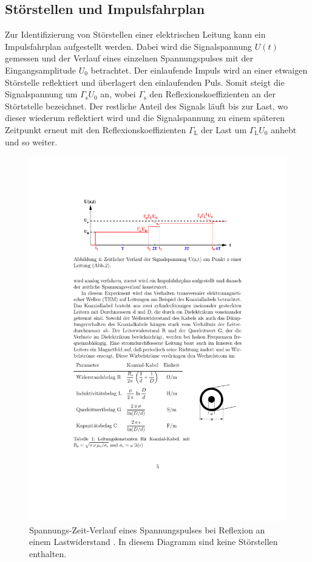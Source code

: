 \subsection{Störstellen und Impulsfahrplan} %
\label{sub:impulsfahrplan}
Zur Identifizierung von Störstellen einer elektrischen Leitung kann ein
Impulsfahrplan aufgestellt werden.
Dabei wird die Signalspannung $U(t)$ gemessen und der Verlauf eines einzelnen
Spannungspulses mit der Eingangsamplitude $U_0$ betrachtet.
Der einlaufende Impuls wird an einer etwaigen Störstelle reflektiert und
überlagert den einlaufenden Puls. Somit steigt die Signalspannung um
$\Gamma_\text{s}U_0$ an, wobei $\Gamma_\text{s}$ den Reflexionskoeffizienten
an der Störtstelle bezeichnet.
Der restliche Anteil des Signals läuft bis zur Last, wo dieser wiederum
reflektiert wird und die Signalspannung zu einem späteren Zeitpunkt erneut
mit den Reflexionskoeffizienten $\Gamma_\text{L}$ der Last um $\Gamma_\text{L}
U_0$ anhebt und so weiter.
\begin{figure}[b]
    \center
    \includegraphics[width=0.9\linewidth]{img/spannung-zeit.pdf}
    \caption{
        Spannungs-Zeit-Verlauf eines Spannungspulses bei Reflexion an einem
        Lastwiderstand \cite{E02}.
        In diesem Diagramm sind keine Störstellen enthalten.
    }
    \label{fig:spannung-zeit}
\end{figure}

